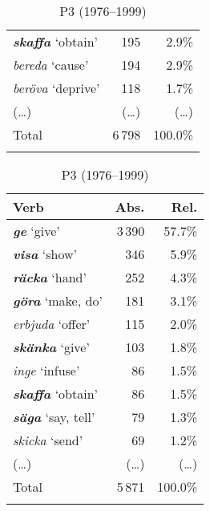 \documentclass[output=paper]{langscibook}
\begin{document}
\begin{table}
\begin{subtable}{.5\linewidth}
\begin{tabularx}{\linewidth}{Xrr}
 \textbf{\textit{skaffa}} ‘obtain’   & 195 & 2.9\%       \\
 \textit{bereda} ‘cause’            & 194 & 2.9\%        \\
 \textit{beröva} ‘deprive’           & 118 & 1.7\%       \\
(…) & (…) & (…) \\
 \midrule
 Total & 6\,798 & 100.0\%\\
\lspbottomrule
\end{tabularx}
\end{subtable}\begin{subtable}{.5\linewidth}
\caption{P3 (1976–1999)}
\begin{tabularx}{\linewidth}{Xrr}
    \lsptoprule
Verb & Abs.   & Rel.   \\
\midrule
\textbf{\textit{ge}} ‘give’ & 3\,390 & 57.7\%\\
 \textbf{\textit{visa}} ‘show’ & 346 & 5.9\%\\
 \textbf{\textit{räcka}} ‘hand’ & 252 & 4.3\%\\
 \textbf{\textit{göra}} ‘make, do’ & 181 & 3.1\%\\
 \textit{erbjuda} ‘offer’           & 115 & 2.0\%\\
 \textbf{\textit{skänka}} ‘give’ & 103 & 1.8\%\\
 \textit{inge} ‘infuse’ & 86 & 1.5\%\\
 \textbf{\textit{skaffa}} ‘obtain’ & 86 & 1.5\%\\
 \textbf{\textit{säga}} ‘say, tell’ & 79 & 1.3\%\\
 \textit{skicka} ‘send’ & 69 & 1.2\%\\
(…) & (…) & (…) \\
 \midrule
 Total & 5\,871 & 100.0\%\\
\lspbottomrule
\end{tabularx}
\end{subtable}
\end{table}
\end{document}
